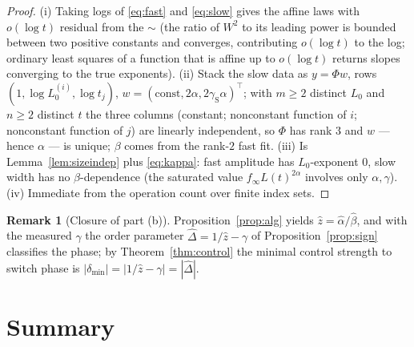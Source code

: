 \documentclass{amsart}
\theoremstyle{definition}
\newtheorem{remark}{Remark}
\newcommand{\asymp}{\sim}
\begin{document}
\begin{proof}
(i) Taking logs of \eqref{eq:fast} and \eqref{eq:slow} gives the affine laws with
$o(\log t)$ residual from the $\asymp$ (the ratio of $W^2$ to its leading power is
bounded between two positive constants and converges, contributing $o(\log t)$ to
the log; ordinary least squares of a function that is affine up to $o(\log t)$
returns slopes converging to the true exponents). (ii) Stack the slow data as
$y=\Phi w$, rows $(1,\log L_0^{(i)},\log t_j)$, $w=(\text{const},2\alpha,
2\gamma_{\mathrm S}\alpha)^\top$; with $m\ge2$ distinct $L_0$ and $n\ge2$ distinct
$t$ the three columns (constant; nonconstant function of $i$; nonconstant function
of $j$) are linearly independent, so $\Phi$ has rank $3$ and $w$ — hence $\alpha$ —
is unique; $\beta$ comes from the rank-$2$ fast fit. (iii) Is
Lemma~\ref{lem:sizeindep} plus \eqref{eq:kappa}: fast amplitude has $L_0$-exponent
$0$, slow width has no $\beta$-dependence (the saturated value $f_\infty L(t)^{2\alpha}$
involves only $\alpha,\gamma$). (iv) Immediate from the operation count over finite
index sets.
\end{proof}

\begin{remark}[Closure of part (b)]
Proposition~\ref{prop:alg} yields $\hat z=\hat\alpha/\hat\beta$, and with the
measured $\gamma$ the order parameter $\widehat\Delta=1/\hat z-\gamma$ of
Proposition~\ref{prop:sign} classifies the phase; by Theorem~\ref{thm:control} the
minimal control strength to switch phase is
$|\delta_{\min}|=|1/\hat z-\gamma|=|\widehat\Delta|$.
\end{remark}

\section{Summary}
\end{document}
